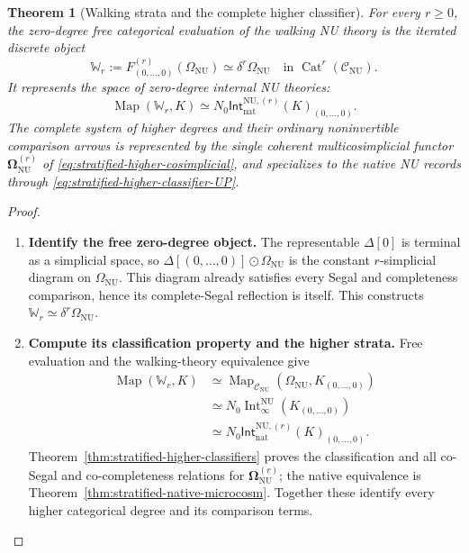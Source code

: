 \documentclass[oneside]{article}
\theoremstyle{plain}
\newtheorem{theorem}{Theorem}[section]
\theoremstyle{definition}
\theoremstyle{remark}
\newcommand{\CNU}{\mathcal C_{\mathrm{NU}}}
\newcommand{\Int}{\operatorname{Int}}
\newcommand{\Map}{\operatorname{Map}}
\newcommand{\NU}{\mathrm{NU}}
\begin{document}
\begin{theorem}[Walking strata and the complete higher classifier]
\label{thm:stratified-walking-strata}
For every $r\geq0$, the zero-degree free categorical evaluation
of the walking NU theory is the iterated discrete object
\[
 \mathbb W_r
 :=F^{(r)}_{(0,\ldots,0)}(\Omega_{\NU})
 \simeq\delta^r\Omega_{\NU}
 \quad\text{in }\operatorname{Cat}^r(\CNU).
\]
It represents the space of zero-degree internal NU theories:
\begin{equation}\label{eq:stratified-walking-zero}
 \Map(\mathbb W_r,K)
 \simeq N_0\mathsf{Int}^{\NU,(r)}_{\mathrm{nat}}(K)_{(0,\ldots,0)}.
\end{equation}
The complete system of higher degrees and their ordinary
noninvertible comparison arrows is represented by the single coherent
multicosimplicial functor
$\boldsymbol\Omega^{(r)}_{\NU}$ of
\eqref{eq:stratified-higher-cosimplicial}, and specializes to the
native NU records through
\eqref{eq:stratified-higher-classifier-UP}.
\end{theorem}
\begin{proof}
\leavevmode
\begin{enumerate}
\item \textbf{Identify the free zero-degree object.}
The representable $\Delta[0]$ is terminal as a simplicial space, so
$\Delta[(0,\ldots,0)]\odot\Omega_{\NU}$ is the constant
$r$-simplicial diagram on $\Omega_{\NU}$.  This diagram already
satisfies every Segal and completeness comparison, hence its
complete-Segal reflection is itself.  This constructs
$\mathbb W_r\simeq\delta^r\Omega_{\NU}$.
\item \textbf{Compute its classification property and the higher strata.}
Free evaluation and the walking-theory equivalence give
\begin{align*}
 \Map(\mathbb W_r,K)
 &\simeq\Map_{\CNU}(\Omega_{\NU},K_{(0,\ldots,0)})\\
 &\simeq N_0\Int^{\NU}_\infty(K_{(0,\ldots,0)})\\
 &\simeq N_0\mathsf{Int}^{\NU,(r)}_{\mathrm{nat}}(K)_{(0,\ldots,0)}.
\end{align*}
Theorem~\ref{thm:stratified-higher-classifiers} proves the
classification and all co-Segal and co-completeness relations for
$\boldsymbol\Omega^{(r)}_{\NU}$; the native equivalence is
Theorem~\ref{thm:stratified-native-microcosm}.  Together these
identify every higher categorical degree and its comparison terms.
\qedhere
\end{enumerate}
\end{proof}
\end{document}
